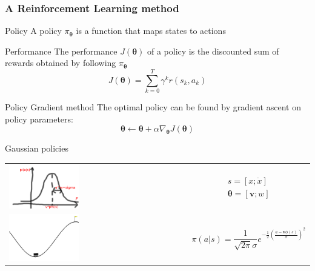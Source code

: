 \documentclass{beamer}
\newcommand{\vtheta}{{\boldsymbol{\theta}}}
\newcommand*{\gradj}{\nabla_{\vtheta}J(\vtheta)}
\newcommand{\vv}{\boldsymbol{v}}
\begin{document}
\begin{frame}
\frametitle{A Reinforcement Learning method}
\begin{block}{Policy}
A policy $\pi_{\vtheta}$ is a function that maps states to actions
\end{block}

\begin{block}{Performance}
The performance $J(\vtheta)$ of a policy is the discounted sum of rewards obtained by following $\pi_{\vtheta}$
\[
J(\vtheta) = \sum_{k=0}^T \gamma^k r(s_k, a_k)
\]
\end{block}

\begin{block}{Policy Gradient method}
The optimal policy can be found by gradient ascent on policy parameters: 
\[
\vtheta \gets \vtheta + \alpha \gradj
\]
\end{block}

\end{frame}


\begin{frame}{Gaussian policies}

\begin{table}
\begin{tabular}[t]{m{}  m{}}

\includegraphics[width=0.4\textwidth]{pictures/gauss.png} &
\begin{minipage}{0.5\textwidth}\Large
\begin{align*}
s = [x; \dot{x}] \\ \vtheta = [\vv; w]
\end{align*}
\end{minipage}
 \\
\includegraphics[width=0.4\textwidth]{pictures/mountain_car} &
 \begin{minipage}{0.5\textwidth}\Large \begin{equation*}
\pi(a|s) = \frac{1}{\sqrt{2\pi}\sigma}e^{-\frac{1}{2}\left(\frac{a - \vv\phi(s)}{\sigma}\right)^2}
\end{equation*}
\end{minipage}

\end{tabular}
\end{table}

\end{frame}
\end{document}
